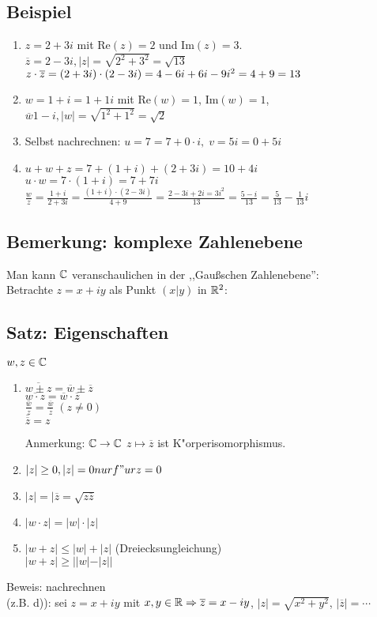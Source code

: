 \subsection{Beispiel}
\begin{enumerate}
	\item
	$z= 2+3i$ mit Re$(z)=2$ und Im$(z)=3$.\\
	$\overline{z} = 2-3i, |z|=\sqrt{2^2+3^2}= \sqrt{13}$\\
	$z \cdot \overline{z}=(2+3i)\cdot(2-3i)\\
	=4-6i+6i-9i^2
	=4+9=13$
	\item
	$w= 1+i = 1+1i$ mit Re$(w)=1$, Im$(w)=1$, $\overline{w} 1-i, |w|=\sqrt{1^2+1^2}=\sqrt{2}$
	\item
	Selbst nachrechnen: $u=7=7+0 \cdot i,\; v= 5i=0+5i$
	\item
	$u+w+z = 7+ (1+i) + (2+3i) = 10 + 4i$\\
	$u \cdot w = 7 \cdot (1+i) = 7+7i$\\ 
	$ \frac{w}{z}= \frac{1+i}{2+3i}= \frac{(1+i)\cdot(2-3i)}{4+9} = \frac{2-3i+2i=3i^2}{13}= \frac{5-i}{13}=\frac{5}{13}-\frac{1}{13}i$
\end{enumerate}

\subsection{Bemerkung: komplexe Zahlenebene}
Man kann $\mathbb{C}$ veranschaulichen in der ,,Gaußschen Zahlenebene'':\\
Betrachte $z=x+iy$ als Punkt $(x|y)$ in $\mathbb{R}^2$:

\subsection{Satz: Eigenschaften}
$w,z \in \mathbb{C}$
\begin{enumerate}
	\item
	$\overline{w \pm z } = \overline{w} \pm \overline{z}$\\
	$\overline{w \cdot z} = \overline{w } \cdot \overline{z}$\\
	$\overline{\frac{w}{z}} = \frac{\overline{w}}{\overline{z}}\; (z \neq 0)$\\
	$\overline{\overline{z}} = z$

	Anmerkung: $\mathbb{C} \rightarrow \mathbb{C}$ $z \mapsto \overline{z}$ ist K"orperisomorphismus.
	\item
	$|z| \geq 0, |z|= 0 nur f"ur z=0$
	\item
	$|z| = |\overline{z} = \sqrt{z\overline{z}}$
	\item
	$|w\cdot z| = |w| \cdot |z|$
	\item
	$|w+z| \leq |w| + |z|$ (Dreiecksungleichung)\\
	$|w+z| \geq ||w| - |z||$
\end{enumerate}
Beweis: nachrechnen\\
(z.B. d)): sei $z= x+iy$ mit $x,y \in \mathbb{R} \Rightarrow \overline{z} = x - iy$, $|z|= \sqrt{x^2+y^2}$, $|\overline{z}|= \cdots$
